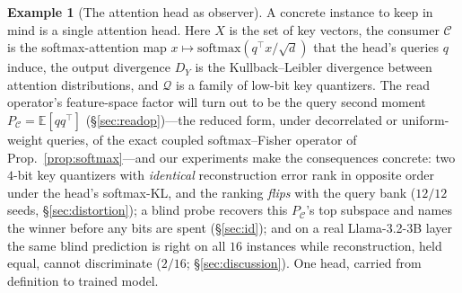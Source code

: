 \documentclass[lettersize,onecolumn]{IEEEtran}
\theoremstyle{definition}
\newtheorem{example}{Example}
\theoremstyle{remark}
\newcommand{\PC}{P_{\mathcal{C}}}
\newcommand{\E}{\mathbb{E}}
\begin{document}
\begin{example}[The attention head as observer]\label{ex:head}
A concrete instance to keep in mind is a single attention head. Here $X$ is the set of
key vectors, the consumer $\mathcal{C}$ is the softmax-attention map
$x\mapsto\mathrm{softmax}(q^\top x/\sqrt d)$ that the head's queries $q$ induce, the
output divergence $D_Y$ is the Kullback--Leibler divergence between attention
distributions, and $\mathcal{Q}$ is a family of low-bit key quantizers. The read
operator's feature-space factor will turn out to be the query second moment
$\PC=\E[qq^\top]$ (\S\ref{sec:readop})---the reduced form, under decorrelated or
uniform-weight queries, of the exact coupled softmax--Fisher operator of
Prop.~\ref{prop:softmax}---and our experiments make the consequences concrete: two $4$-bit
key quantizers with \emph{identical} reconstruction error rank in opposite order under
the head's softmax-KL, and the ranking \emph{flips} with the query bank
($12/12$ seeds, \S\ref{sec:distortion}); a blind probe recovers this $\PC$'s top
subspace and names the winner before any bits are spent (\S\ref{sec:id}); and on a
real Llama-3.2-3B layer the same blind prediction is right on all $16$ instances while
reconstruction, held equal, cannot discriminate ($2/16$; \S\ref{sec:discussion}). One
head, carried from definition to trained model.
\end{example}
\end{document}
